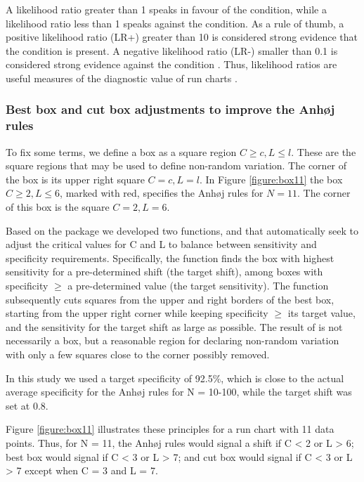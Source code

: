 A likelihood ratio greater than 1 speaks in favour of the condition,
while a likelihood ratio less than 1 speaks against the condition. As a
rule of thumb, a positive likelihood ratio (LR+) greater than 10 is
considered strong evidence that the condition is present. A negative
likelihood ratio (LR-) smaller than 0.1 is considered strong evidence
against the condition \citep{deeks2004}. Thus, likelihood ratios are
useful measures of the diagnostic value of run charts
\citep{anhoej2015, anhoej2018}.

\hypertarget{best-box-and-cut-box-adjustments-to-improve-the-anhj-rules}{%
\subsubsection{Best box and cut box adjustments to improve the Anhøj
rules}\label{best-box-and-cut-box-adjustments-to-improve-the-anhj-rules}}

To fix some terms, we define a box as a square region
\(C \geq c, L \leq l\). These are the square regions that may be used to
define non-random variation. The corner of the box is its upper right
square \(C = c, L = l\). In Figure \ref{figure:box11} the box
\(C \geq 2, L \leq 6\), marked with red, specifies the Anhøj rules for
\(N=11\). The corner of this box is the square \(C = 2, L = 6\).

Based on the  package we developed two functions,
 and  that automatically seek to adjust
the critical values for C and L to balance between sensitivity and
specificity requirements. Specifically, the  function
finds the box with highest sensitivity for a pre-determined shift (the
target shift), among boxes with specificity \(\geq\) a pre-determined
value (the target sensitivity). The  function
subsequently cuts squares from the upper and right borders of the best
box, starting from the upper right corner while keeping specificity
\(\geq\) its target value, and the sensitivity for the target shift as
large as possible. The result of  is not necessarily a
box, but a reasonable region for declaring non-random variation with
only a few squares close to the corner possibly removed.

In this study we used a target specificity of 92.5\%, which is close to
the actual average specificity for the Anhøj rules for N = 10-100, while
the target shift was set at 0.8.

Figure \ref{figure:box11} illustrates these principles for a run chart
with 11 data points. Thus, for N = 11, the Anhøj rules would signal a
shift if C \textless{} 2 or L \textgreater{} 6; best box would signal if
C \textless{} 3 or L \textgreater{} 7; and cut box would signal if C
\textless{} 3 or L \textgreater{} 7 except when C = 3 and L = 7.

